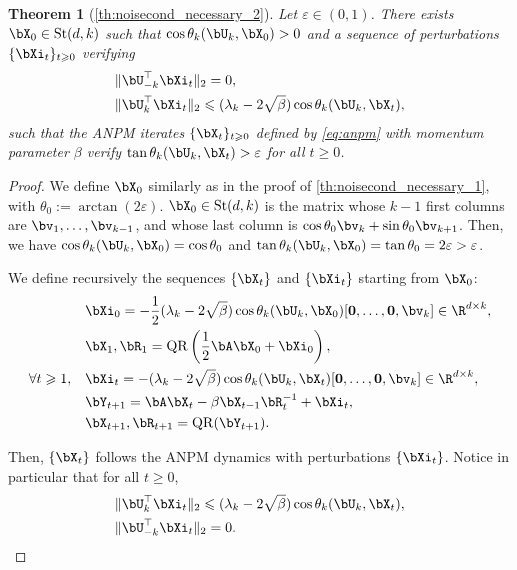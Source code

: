 \documentclass{article}
\theoremstyle{plain}
\newtheorem{theorem}{Theorem}[section]
\theoremstyle{definition}
\theoremstyle{remark}
\begin{document}
\begin{theorem}[\cref{th:noisecond_necessary_2}]
  Let $\varepsilon \in (0,1)$. There exists $\bX_0 \in \mathrm{St}(d,k)$ such that $\cos\theta_k(\bU_k, \bX_0) > 0$ and a sequence of perturbations $\{\bXi_t\}_{t\geqslant 0}$ verifying
  \begin{align*}
    & \Vert \bU_{-k}^\top\bXi_t \Vert_2 = 0,\\
    & \Vert \bU_k^\top \bXi_t \Vert_2 \leqslant (\lambda_k - 2\sqrt{\beta}) \cos\theta_k(\bU_k, \bX_t),
  \end{align*}
  such that the ANPM iterates $\{\bX_t\}_{t\geqslant 0}$ defined by \eqref{eq:anpm} with momentum parameter $\beta$ verify $\tan\theta_k(\bU_k, \bX_t) > \varepsilon$ for all $t\geqslant 0$.
\end{theorem}


\begin{proof}
  We define $\bX_0$ similarly as in the proof of \cref{th:noisecond_necessary_1}, with $\theta_0 := \arctan(2{\varepsilon})$. $\bX_0 \in \mathrm{St}(d,k)$ is the matrix whose $k-1$ first columns are $\bv_1,\dots,\bv_{k-1}$, and whose last column is $\cos\theta_0\bv_k + \sin\theta_0 \bv_{k+1}$. Then, we have $\cos\theta_k(\bU_k,\bX_0) = \cos\theta_0$ and $\tan \theta_k(\bU_k, \bX_0) = \tan \theta_0 = 2{\varepsilon} > \varepsilon$.

  We define recursively the sequences $\{\bX_t\}$ and $\{\bXi_t\}$ starting from $\bX_0$:
  \begin{align*}
    & \bXi_0 = -\frac{1}{2}(\lambda_k-2\sqrt{\beta})\cos\theta_k(\bU_k,\bX_0) [\mathbf{0}, \dots, \mathbf{0}, \bv_{k}] \in \R^{d\times k}, \\
    & \bX_1, \bR_1 = \mathrm{QR}\left(\frac{1}{2}\bA \bX_0 + \bXi_0\right), \\
    \forall t \geqslant 1, \quad & \bXi_t = - (\lambda_k - 2\sqrt{\beta})\cos\theta_k(\bU_k,\bX_t) [\mathbf{0}, \dots, \mathbf{0}, \bv_{k}] \in \R^{d\times k}, \\
    & \bY_{t+1} = \bA \bX_t - \beta \bX_{t-1} \bR_t^{-1} + \bXi_t, \\
    & \bX_{t+1}, \bR_{t+1} = \mathrm{QR}(\bY_{t+1}).
  \end{align*}

  Then, $\{\bX_t\}$ follows the ANPM dynamics with perturbations $\{\bXi_t\}$. Notice in particular that for all $t\geqslant 0$,
  \begin{align*}
    & \Vert \bU_{k}^\top \bXi_t \Vert_2 \leqslant (\lambda_k - 2\sqrt{\beta})\cos\theta_k(\bU_k,\bX_t), \\
    & \Vert \bU_{-k}^\top \bXi_t \Vert_2 = 0.
  \end{align*}
  

\end{proof}
\end{document}
